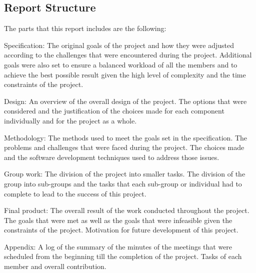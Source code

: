 \documentclass[a4paper,11pt]{article}
\begin{document}
\subsection{Report Structure}

The parts that this report includes are the following:


Specification: The original goals of the project and how they were adjusted according to the challenges that were encountered during the project. Additional goals were also set to ensure a balanced workload of all the members and to achieve the best possible result given the high level of complexity and the time constraints of the project.

Design: An overview of the overall design of the project. The options that were considered and the justification of the choices made for each component individually and for the project as a whole.

Methodology: The methods used to meet the goals set in the specification. The problems and challenges that were faced during the project. The choices made and the software development techniques used to address those issues.

Group work: The division of the project into smaller tasks. The division of the group into sub-groups and the tasks that each sub-group or individual had to complete to lead to the success of this project.

Final product: The overall result of the work conducted throughout the project. The goals that were met as well as the goals that were infeasible given the constraints of the project. Motivation for future development of this project.

Appendix: A log of the summary of the minutes of the meetings that were scheduled from the beginning till the completion of the project. Tasks of each member and overall contribution.



{}

\end{document}
